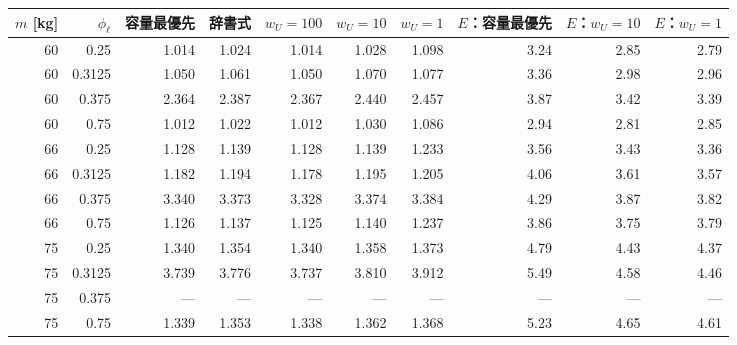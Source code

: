 \begin{tabular}{rr|rrrrr|rrr}
\toprule
$m$ [kg] & $\phi_\ell$ & 容量最優先 & 辞書式 & $w_U{=}100$ & $w_U{=}10$ & $w_U{=}1$ & $E$：容量最優先 & $E$：$w_U{=}10$ & $E$：$w_U{=}1$ \\
\midrule
60 & 0.25 & 1.014 & 1.024 & 1.014 & 1.028 & 1.098 & 3.24 & 2.85 & 2.79 \\
60 & 0.3125 & 1.050 & 1.061 & 1.050 & 1.070 & 1.077 & 3.36 & 2.98 & 2.96 \\
60 & 0.375 & 2.364 & 2.387 & 2.367 & 2.440 & 2.457 & 3.87 & 3.42 & 3.39 \\
60 & 0.75 & 1.012 & 1.022 & 1.012 & 1.030 & 1.086 & 2.94 & 2.81 & 2.85 \\
66 & 0.25 & 1.128 & 1.139 & 1.128 & 1.139 & 1.233 & 3.56 & 3.43 & 3.36 \\
66 & 0.3125 & 1.182 & 1.194 & 1.178 & 1.195 & 1.205 & 4.06 & 3.61 & 3.57 \\
66 & 0.375 & 3.340 & 3.373 & 3.328 & 3.374 & 3.384 & 4.29 & 3.87 & 3.82 \\
66 & 0.75 & 1.126 & 1.137 & 1.125 & 1.140 & 1.237 & 3.86 & 3.75 & 3.79 \\
75 & 0.25 & 1.340 & 1.354 & 1.340 & 1.358 & 1.373 & 4.79 & 4.43 & 4.37 \\
75 & 0.3125 & 3.739 & 3.776 & 3.737 & 3.810 & 3.912 & 5.49 & 4.58 & 4.46 \\
75 & 0.375 & --- & --- & --- & --- & --- & --- & --- & --- \\
75 & 0.75 & 1.339 & 1.353 & 1.338 & 1.362 & 1.368 & 5.23 & 4.65 & 4.61 \\
\bottomrule
\end{tabular}
